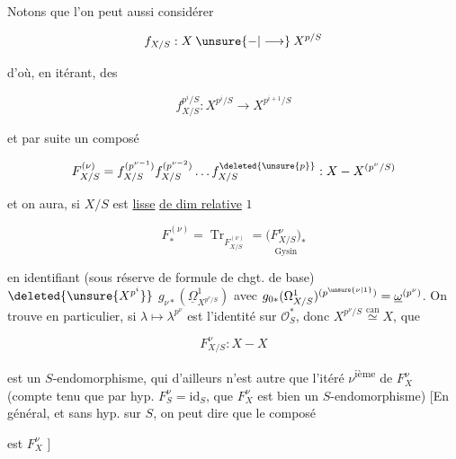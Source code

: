 
Notons que l'on peut aussi considérer

\[
f_{X/S}:X\mathbin{\unsure{-|\longrightarrow}}X^{p/S}
\]

d'où, en itérant, des

\[
f_{X/S}^{p^i/S}:X^{p^i/S}\longrightarrow X^{p^{i+1}/S}
\]

et par suite un composé

\[
F_{X/S}^{(\nu)}=f_{X/S}^{(p^{\nu-1})}f_{X/S}^{(p^{\nu-2})}\ldots f_{X/S}^{\deleted{\unsure{p}}}:
X\mathbin{-}X^{(p^\nu/S)}
\]

et on aura, si $X/S$ est \uline{lisse} \uline{de dim relative} $1$

\[
F_*^{(\nu)}=\operatorname{Tr}_{F_{X/S}^{(\nu)}}=\underset{\text{Gysin}}{\bigl(F_{X/S}^{\nu}\bigr)_*}
\]

en identifiant (sous réserve de formule de chgt. de base) $\deleted{\unsure{X^{p^i}}}$ $g_{\nu*}(\underline\Omega^1_{X^{p^\nu/S}})$ avec $g_{0*}(\Omega^1_{X/S})^{(p^{\unsure{\nu|1}})}=\underline\omega^{(p^\nu)}$. On trouve en particulier, si $\lambda\longmapsto\lambda^{p^\nu}$ est l'identité sur $\mathcal O_S^{*}$, donc $X^{p^\nu/S}\overset{\mathrm{can}}{\simeq}X$, que

\[
F^\nu_{X/S}:X\mathbin{-}X
\]

est un $S$-endomorphisme, qui d'ailleurs n'est autre que l'itéré $\nu$\textsuperscript{ième} de $F_X^\nu$ (compte tenu que par hyp. $F_S^\nu=\mathrm{id}_S$,  que $F_X^\nu$ est bien un $S$-endomorphisme) [En général, et sans hyp. sur $S$, on peut dire que le composé


est $F_X^\nu$ ]

